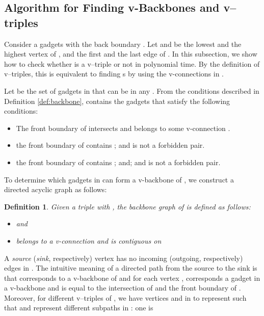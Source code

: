 \documentclass[11pt]{article}
\newtheorem{definition}[figure]{Definition}
\begin{document}
\subsection{Algorithm for Finding v-Backbones and v--triples}
\label{sec:triple}

Consider a gadgets  with the back boundary .
Let  and  be the lowest and the highest vertex of ,
 and  the first
and the last edge of . In this subsection,
we show how to check whether  is a v--triple or not
in polynomial time.
By the definition of v--triples,
this is equivalent to finding
s by using the v-connections in .

Let  be the set of gadgets in  that can be in
any . From the conditions described in
Definition \ref{def:backbone},  contains the gadgets
 that satisfy the following conditions:

\begin{itemize}
\item The front boundary of  intersects  and  belongs to
some v-connection .

\item the front boundary of  contains ;
and  is not a forbidden pair.

\item the front boundary of  contains ;
and;
and  is not a forbidden pair.
\end{itemize}







To determine which gadgets in  can form
a v-backbone of , we construct a directed acyclic graph
  as follows:

\begin{definition}\label{gra:L}
Given a triple  with ,
the \emph{backbone graph}  of  is defined as follows:
\begin{itemize}

\item  and

\item 


belongs to a v-connection  and
 is contiguous on  

\end{itemize}
\end{definition}
A \emph{source} (\emph{sink}, respectively) vertex
has no incoming (outgoing, respectively) edges in .
The intuitive meaning of a directed path 
from the source to the sink
is that  corresponds to a v-backbone of  and
for each vertex ,  corresponds a gadget in a v-backbone
and  is equal to the intersection  of 
and the front boundary of .
Moreover, for different v--triples of 
,
we have vertices  and 
in  to represent 
such that  and  represent different subpaths in :
one is
\end{document}
